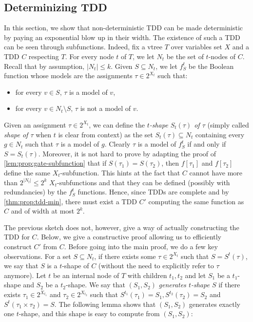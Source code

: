 \documentclass[a4paper,UKenglish,cleveref, autoref, thm-restate]{lipics-v2021}
\newcommand{\guy}[1]{\todo[color=purple]{\color{white}{{\bf Guy}: #1}}}
\begin{document}
\begin{toappendix}
\section{Determinizing TDD} 
\label{sec:prop:detTDD}

In this section, we show that non-deterministic TDD can be made deterministic by paying an exponential blow up in their width. The existence of such a TDD can be seen through subfunctions. Indeed, fix a vtree $T$ over variables set $X$ and a TDD $C$ respecting $T$.  For every node $t$ of $T$, we let $N_t$ be the set of $t$-nodes of $C$. Recall that by assumption, $|N_t| \leq k$. Given $S \subseteq N_t$, we let $f^t_S$ be the Boolean function whose models are the assignments $\tau \in 2^{X_t}$ such that:
\begin{itemize}
	\item for every $v \in S$, $\tau$ is a model of $v$,
	\item for every $v \in N_t \setminus S$, $\tau$ is not a model of $v$.
\end{itemize}
Given an assignment $\tau \in 2^{X_t}$, we can define the \emph{$t$-shape $S_t(\tau)$ of $\tau$} (simply called \emph{shape of $\tau$} when $t$ is clear from context) as the set $S_t(\tau) \subseteq N_t$ containing every $g \in N_t$
such that $\tau$ is a model of $g$.  Clearly $\tau$ is a model of $f^t_S$ if and only if $S = S_t(\tau)$. Moreover, it is not hard to prove by adapting the proof of \cref{lem:prop:gate-subfunction} that if  $S(\tau_1) = S(\tau_2)$, then  $f[\tau_1]$ and $f[\tau_2]$ define the same $X_t$-subfunction. This hints at the fact that $C$ cannot have more than $2^{|N_t|} \leq 2^k$ $X_t$-subfunctions and that they can be defined (possibly with redundancies) by the $f^t_S$ functions. Hence, since TDDs are complete and by \cref{thm:prop:tdd-min}, there must exist a TDD $C'$ computing the same function as $C$ and of width at most $2^k$.

The previous sketch does not, however, give a way of actually constructing the TDD for $C$. Below, we give a constructive proof allowing us to efficiently construct $C'$ from $C$. Before going into the main proof, we do a few key observations. For a set $S \subseteq N_t$, if there exists some $\tau \in 2^{X_t}$ such that $S = S^t(\tau)$, we say that $S$ is a $t$-shape of $C$ (without the need to explicitly refer to $\tau$ anymore). Let $t$ be an internal node of $T$ with children $t_1,t_2$ and let $S_1$ be a $t_1$-shape and $S_2$ be a $t_2$-shape. We say that $(S_1,S_2)$ \emph{generates $t$-shape $S$} if there exists $\tau_1 \in 2^{X_{t_1}}$ and $\tau_2 \in 2^{X_{t_2}}$ such that $S^{t_1}(\tau_1) = S_1, S^{t_2}(\tau_2) = S_2$ and $S^{t}(\tau_1 \times \tau_2) = S$. The following lemma shows that $(S_1,S_2)$ generates exactly one $t$-shape, and this shape is easy to compute from $(S_1,S_2)$:


\end{toappendix}
\end{document}
